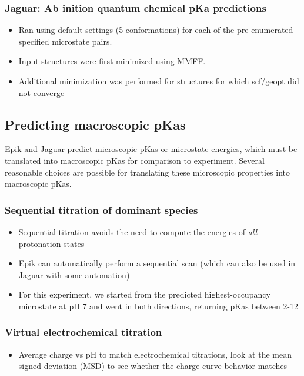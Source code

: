 \documentclass[9pt,lineno]{elife}
\begin{document}
\subsubsection{Jaguar: Ab inition quantum chemical pKa predictions}
\begin{itemize}
    \item Ran using default settings (5 conformations) for each of the pre-enumerated specified microstate pairs.
    \item Input structures were first minimized using MMFF.
    \item Additional minimization was performed for structures for which scf/geopt did not converge
\end{itemize}

\subsection{Predicting macroscopic pKas}

Epik and Jaguar predict microscopic pKas or microstate energies, which must be translated into macroscopic pKas for comparison to experiment.
Several reasonable choices are possible for translating these microscopic properties into macroscopic pKas.

\subsubsection{Sequential titration of dominant species} 

\begin{itemize}
    \item Sequential titration avoids the need to compute the energies of \emph{all} protonation states
    \item Epik can automatically perform a sequential scan (which can also be used in Jaguar with some automation)
    \item For this experiment, we started from the predicted highest-occupancy microstate at pH 7 and went in both directions, returning pKas between 2-12
\end{itemize}

\subsubsection{Virtual electrochemical titration}
\begin{itemize}
    \item Average charge vs pH to match electrochemical titrations, look at the mean signed deviation (MSD) to see whether the charge curve behavior matches
\end{itemize}
\end{document}
